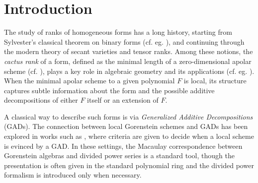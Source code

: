 \documentclass[a4paper,11p]{amsart}
\begin{document}

\section*{Introduction}

The study of ranks of homogeneous forms has a long history, starting from Sylvester’s classical theorem on binary forms (cf. eg. \cite{BERNARDI201134, Bernard}), and continuing through the modern theory of secant varieties and tensor ranks.  
Among these notions, the \emph{cactus rank} of a form, defined as the minimal length of a zero-dimensional apolar scheme (cf. \cite{IK, BR13}), plays a key role in algebraic geometry and its applications (cf. eg. \cite{MR3729273}).  
When the minimal apolar scheme to a given polynomial $F$ is local, its structure captures subtle information about the form and the possible additive decompositions of either $F$ itself or an extension of $F$.

A classical way to describe such forms is via \emph{Generalized Additive Decompositions} (GADs). The connection between local Gorenstein schemes and GADs has been explored in works such as \cite{IK,MR3250539,GAD, BJPR}, where criteria are given to decide when a local scheme is evinced by a GAD.  
In these settings, the Macaulay correspondence between Gorenstein algebras and divided power series is a standard tool, though the presentation is often given in the standard polynomial ring and the divided power formalism is introduced only when necessary.
\end{document}
